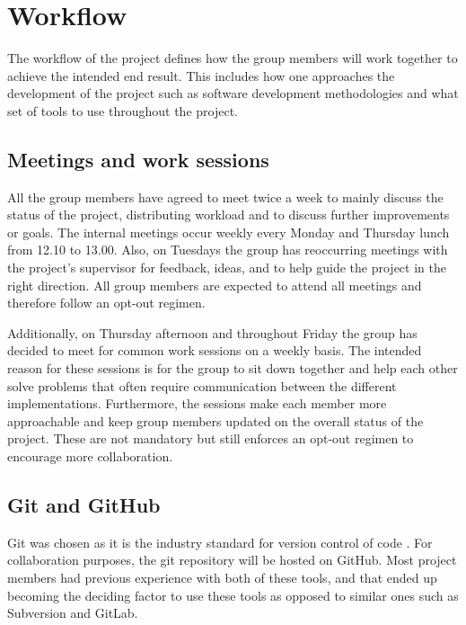 \section{Workflow}

The workflow of the project defines how the group members will work together to achieve the intended end result.
This includes how one approaches the development of the project such as software development methodologies and what set of tools to use throughout the project.

\subsection{Meetings and work sessions} 
All the group members have agreed to meet twice a week to mainly discuss the status of the project, distributing workload and to discuss further improvements or goals.
The internal meetings occur weekly every Monday and Thursday lunch from 12.10 to 13.00.
Also, on Tuesdays the group has reoccurring meetings with the project's supervisor for feedback, ideas, and to help guide the project in the right direction.
All group members are expected to attend all meetings and therefore follow an opt-out regimen.

Additionally, on Thursday afternoon and throughout Friday the group has decided to meet for common work sessions on a weekly basis.
The intended reason for these sessions is for the group to sit down together and help each other solve problems that often require communication between the different implementations.
Furthermore, the sessions make each member more approachable and keep group members updated on the overall status of the project.
These are not mandatory but still enforces an opt-out regimen to encourage more collaboration.

\subsection{Git and GitHub}
Git was chosen as it is the industry standard for version control of code \cite{git_industry_standard}.
For collaboration purposes, the git repository will be hosted on GitHub.
Most project members had previous experience with both of these tools, and that ended up becoming the deciding factor to use these tools as opposed to similar ones such as Subversion and GitLab.

